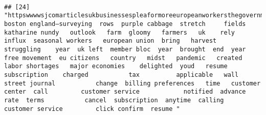 \documentclass[
]{article}
\begin{document}
\begin{verbatim}
                                                                                                                                                                                                                                                                                                                                                                                                                                                                   
## [24] "httpswwwwsjcomarticlesukbusinessespleaformoreeuropeanworkersthegovernmentsaysno boston england—surveying  rows  purple cabbage  stretch     fields katharine nundy   outlook   farm  gloomy   farmers   uk    rely   influx  seasonal workers   european union  bring   harvest   struggling    year  uk left  member bloc  year  brought  end  year   free movement  eu citizens   country   midst   pandemic   created labor shortages   major economies    delighted  youd   resume  subscription    charged           tax          applicable   wall street journal           change  billing preferences   time   customer center  call         customer service            notified  advance     rate  terms           cancel  subscription  anytime  calling         customer service         click confirm  resume "                                                                                                                                                                                                                                                                                                                                                                                                                                                                                                                                                                                                                                                                                                                                                                                                                                                                                                                                                                                                                                                                                                                                                                                                                                                                                                                                                                                                                                                                                                                                                                                                                                                                                                                                                                                                                                                                                                                                                                                                                                                                                                                                              
\end{verbatim}
\end{document}
